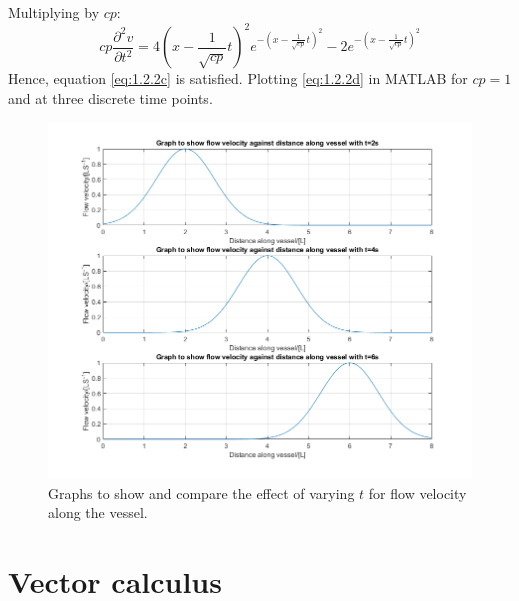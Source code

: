 \documentclass[11pt]{article}
\numberwithin{equation}{section}
\begin{document}
Multiplying by $cp$:
\begin{equation}
    cp\frac{\partial^2v}{\partial t^2} = 4\left(x - \frac{1}{\sqrt{cp}}t\right)^2 e^{-\left(x- \frac{1}{\sqrt{cp}}t\right)^2} -2e^{-\left(x- \frac{1}{\sqrt{cp}}t\right)^2}
\end{equation}
Hence, equation \ref{eq:1.2.2c} is satisfied. Plotting \ref{eq:1.2.2d} in MATLAB  for $cp = 1$ and at three discrete time points. 

\begin{figure}[H]
    \centering
    \includegraphics[width = \textwidth]{./img/q102b.png}
    \caption{Graphs to show and compare the effect of varying $t$ for flow velocity along the vessel.}
    \label{fig:q306a}
\end{figure}
\section{Vector calculus}
\end{document}
